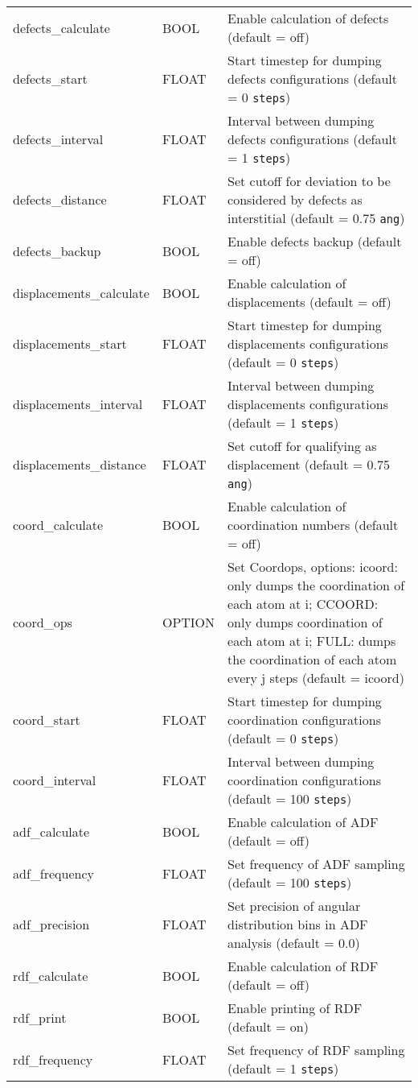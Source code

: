 \begin{longtable}{l l p{10cm}}
defects\_calculate & BOOL & Enable calculation of defects (default = off) \\
defects\_start & FLOAT & Start timestep for dumping defects configurations (default = 0 \verb#steps#) \\
defects\_interval & FLOAT & Interval between dumping defects configurations (default = 1 \verb#steps#) \\
defects\_distance & FLOAT & Set cutoff for deviation to be considered by defects as interstitial (default = 0.75 \verb#ang#) \\
defects\_backup & BOOL & Enable defects backup (default = off) \\
displacements\_calculate & BOOL & Enable calculation of displacements (default = off) \\
displacements\_start & FLOAT & Start timestep for dumping displacements configurations (default = 0 \verb#steps#) \\
displacements\_interval & FLOAT & Interval between dumping displacements configurations (default = 1 \verb#steps#) \\
displacements\_distance & FLOAT & Set cutoff for qualifying as displacement (default = 0.75 \verb#ang#) \\
coord\_calculate & BOOL & Enable calculation of coordination numbers (default = off) \\
coord\_ops & OPTION & Set Coordops, options: icoord: only dumps the coordination of each atom at i; CCOORD: only dumps coordination of each atom at i; FULL: dumps the coordination of each atom every j steps (default = icoord) \\
coord\_start & FLOAT & Start timestep for dumping coordination configurations (default = 0 \verb#steps#) \\
coord\_interval & FLOAT & Interval between dumping coordination configurations (default = 100 \verb#steps#) \\
adf\_calculate & BOOL & Enable calculation of ADF (default = off) \\
adf\_frequency & FLOAT & Set frequency of ADF sampling (default = 100 \verb#steps#) \\
adf\_precision & FLOAT & Set precision of angular distribution bins in ADF analysis (default = 0.0) \\
rdf\_calculate & BOOL & Enable calculation of RDF (default = off) \\
rdf\_print & BOOL & Enable printing of RDF (default = on) \\
rdf\_frequency & FLOAT & Set frequency of RDF sampling (default = 1 \verb#steps#) \\

\end{longtable}
